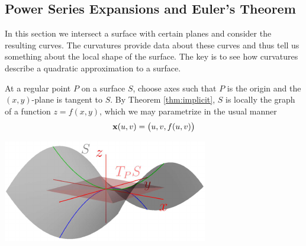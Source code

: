 \begin{exercises}{}{}
\begin{enumerate}
% 
	


\end{enumerate}
\end{exercises}

\clearpage


\subsection{Power Series Expansions and Euler's Theorem}\label{sec:eulersthm}

In this section we intersect a surface with certain planes and consider the resulting curves. The curvatures provide data about these curves and thus tell us something about the local shape of the surface. The key is to see how curvatures describe a quadratic approximation to a surface.\par

\begin{minipage}[t]{0.63\linewidth}\vspace{0pt}
At a regular point $P$ on a surface $S$, choose axes such that $P$ is the origin and the $(x,y)$-plane is tangent\footnotemark{} to $S$. By Theorem \ref{thm:implicit}, $S$ is locally the graph of a function $z=f(x,y)$, which we may parametrize in the usual manner
\[{\mathbf{x}}(u,v)=\bigl(u,v,f(u,v)\bigr)\]
\end{minipage}\hfill\begin{minipage}[t]{0.36\linewidth}\vspace{0pt}
	\flushright\href{http://www.math.uci.edu/~ndonalds/math162a/euler-setup.html}{\includegraphics{euler-setup}}
\end{minipage}\par


